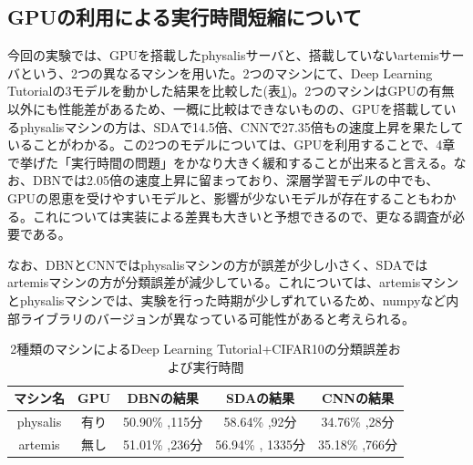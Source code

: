\subsection{GPUの利用による実行時間短縮について}
今回の実験では、GPUを搭載したphysalisサーバと、搭載していないartemisサーバという、2つの異なるマシンを用いた。2つのマシンにて、Deep Learning Tutorialの3モデルを動かした結果を比較した(表\ref{c6_gpu_result})。2つのマシンはGPUの有無以外にも性能差があるため、一概に比較はできないものの、GPUを搭載しているphysalisマシンの方は、SDAで14.5倍、CNNで27.35倍もの速度上昇を果たしていることがわかる。この2つのモデルについては、GPUを利用することで、4章で挙げた「実行時間の問題」をかなり大きく緩和することが出来ると言える。なお、DBNでは2.05倍の速度上昇に留まっており、深層学習モデルの中でも、GPUの恩恵を受けやすいモデルと、影響が少ないモデルが存在することもわかる。これについては実装による差異も大きいと予想できるので、更なる調査が必要である。\par
なお、DBNとCNNではphysalisマシンの方が誤差が少し小さく、SDAではartemisマシンの方が分類誤差が減少している。これについては、artemisマシンとphysalisマシンでは、実験を行った時期が少しずれているため、numpyなど内部ライブラリのバージョンが異なっている可能性があると考えられる。

\begin{table}[tdp]
\caption{2種類のマシンによるDeep Learning Tutorial+CIFAR10の分類誤差および実行時間}
\centering
\begin{tabular}{|c|c|c|c|c|}\hline
マシン名 & GPU & DBNの結果 & SDAの結果 & CNNの結果\\ \hline
physalis & 有り & 50.90\% ,115分 & 58.64\% ,92分  & 34.76\% ,28分  \\ \hline
artemis & 無し & 51.01\% ,236分 & 56.94\% , 1335分 & 35.18\% ,766分 \\ \hline
\end{tabular}
\label{c6_gpu_result}
\end{table}


